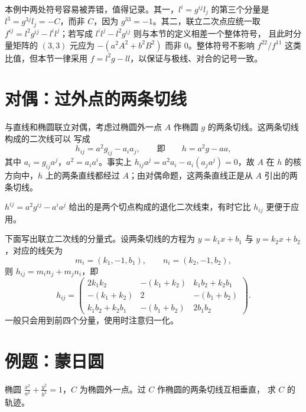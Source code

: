 \begin{remark}
本例中两处符号容易被弄错，值得记录。其一，$l^i=g^{ij}l_j$ 的第三个分量是
$l^3=g^{3j}l_j=-C$，而非 $C$，因为 $g^{33}=-1$。其二，联立二次点应统一取
$f^{ij}=l^2g^{ij}-l^il^j$；若写成 $l^il^j-l^2g^{ij}$ 则与本节的定义相差一个整体符号，
且此时分量矩阵的 $(3,3)$ 元应为 $-(a^2A^2+b^2B^2)$ 而非 $0$。整体符号不影响
$f^{22}/f^{11}$ 这类比值，但本节一律采用 $f=l^2g-ll$，以保证与极线、对合的记号一致。
\end{remark}

\section{对偶：过外点的两条切线}

与直线和椭圆联立对偶，考虑过椭圆外一点 $A$ 作椭圆 $g$ 的两条切线。这两条切线构成的二次线可以
写成
\[
h_{ij}=a^2g_{ij}-a_ia_j,\qquad\text{即}\qquad h=a^2g-aa,
\]
其中 $a_i=g_{ij}a^j$，$a^2=a_ia^i$。事实上 $h_{ij}a^j=a^2a_i-a_i(a_ja^j)=0$，故 $A$ 在 $h$ 的核
方向中，$h$ 上的两条直线都经过 $A$；由对偶命题，这两条直线正是从 $A$ 引出的两条切线。

\begin{remark}
$h^{ij}=a^2g^{ij}-a^ia^j$ 给出的是两个切点构成的退化二次线束，有时它比 $h_{ij}$ 更便于应用。
\end{remark}

下面写出联立二次线的分量式。设两条切线的方程为 $y=k_1x+b_1$ 与 $y=k_2x+b_2$，对应的线矢为
\[
m_i=(k_1,-1,b_1),\qquad n_i=(k_2,-1,b_2),
\]
则 $h_{ij}=m_in_j+m_jn_i$，即
\[
h_{ij}=\begin{pmatrix}
2k_1k_2 & -(k_1+k_2) & k_1b_2+k_2b_1\\
-(k_1+k_2) & 2 & -(b_1+b_2)\\
k_1b_2+k_2b_1 & -(b_1+b_2) & 2b_1b_2
\end{pmatrix}.
\]
一般只会用到前四个分量，使用时注意归一化。

\section{例题：蒙日圆}

\begin{example}
椭圆 $\frac{x^2}{a^2}+\frac{y^2}{b^2}=1$，$C$ 为椭圆外一点。过 $C$ 作椭圆的两条切线互相垂直，
求 $C$ 的轨迹。
\end{example}

